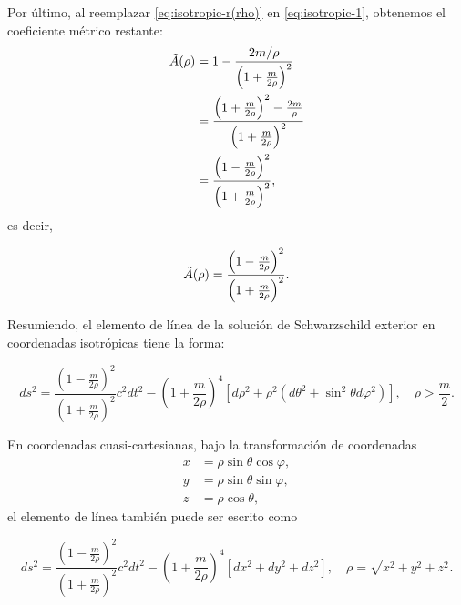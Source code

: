 \documentclass[letterpaper,11pt]{article}
\begin{document}
Por último, al reemplazar \eqref{eq:isotropic-r(rho)} en \eqref{eq:isotropic-1}, obtenemos el coeficiente métrico restante:
\begin{align}
    \Tilde{A}(\rho) &= 1 - \frac{2m/\rho}{\left( 1 + \frac{m}{2\rho}\right)^2} \\
    &= \frac{\left( 1 + \frac{m}{2\rho}\right)^2 - \frac{2m}{\rho}}{\left( 1 + \frac{m}{2\rho}\right)^2} \\
    &= \frac{\left(1 - \frac{m}{2\rho} \right)^2}{\left( 1 + \frac{m}{2\rho}\right)^2},
\end{align}
es decir,
\begin{shaded}
    \begin{equation}
        \Tilde{A}(\rho) = \frac{\left(1 - \frac{m}{2\rho} \right)^2}{\left( 1 + \frac{m}{2\rho}\right)^2}. 
    \end{equation}
\end{shaded}

Resumiendo, el elemento de línea de la solución de Schwarzschild exterior en coordenadas isotrópicas tiene la forma:
\begin{shaded}
    \begin{equation} \label{eq:metric-Schwarz-isotropic-sphere}
        ds^2 = \frac{\left(1 - \frac{m}{2\rho} \right)^2}{\left( 1 + \frac{m}{2\rho}\right)^2} c^2 dt^2 - \left( 1 + \frac{m}{2\rho} \right)^4 \left[d\rho^2 + \rho^2 (d\theta^2 + \sin^2\theta d\varphi^2)\right], \quad \rho > \frac{m}{2}.
    \end{equation}
\end{shaded}

En coordenadas cuasi-cartesianas, bajo la transformación de coordenadas
\begin{align}
    x &= \rho \sin\theta \cos\varphi, \label{eq:esferica-carte-1} \\
    y &= \rho \sin\theta \sin\varphi, \label{eq:esferica-carte-2}\\
    z &= \rho \cos\theta, \label{eq:esferica-carte-3}
\end{align}
el elemento de línea también puede ser escrito como
\begin{shaded}
    \begin{equation}\label{eq:metric-Schwarz-isotropic-carte}
        ds^2 = \frac{\left(1 - \frac{m}{2\rho} \right)^2}{\left( 1 + \frac{m}{2\rho}\right)^2} c^2 dt^2 - \left( 1 + \frac{m}{2\rho} \right)^4 \left[dx^2 + dy^2 + dz^2\right], \quad \rho = \sqrt{x^2 + y^2 + z^2}.
    \end{equation}
\end{shaded}
\end{document}
